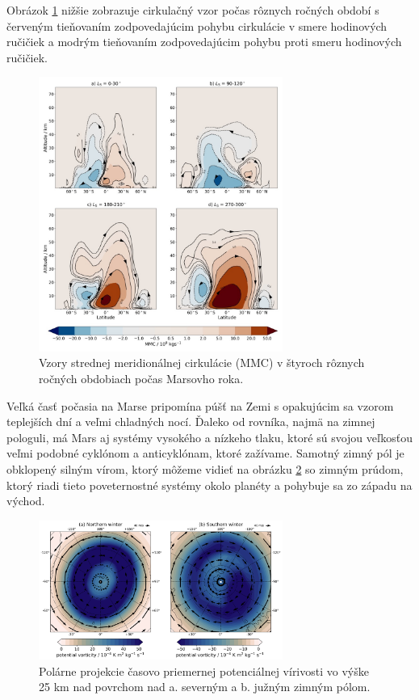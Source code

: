 Obrázok \ref{circLS} nižšie zobrazuje cirkulačný vzor počas rôznych ročných období s červeným tieňovaním zodpovedajúcim pohybu cirkulácie v smere hodinových ručičiek a modrým tieňovaním zodpovedajúcim pohybu proti smeru hodinových ručičiek. 

\begin{figure}[!htbp]
  \centering
  \includegraphics[width=8cm]{img/MARS_circulation_openMars_LS.jpg}
  \caption{Vzory strednej meridionálnej cirkulácie (MMC) v štyroch rôznych ročných obdobiach počas Marsovho roka.}
  \label{circLS}
\end{figure}

Veľká časť počasia na Marse pripomína púšť na Zemi s opakujúcim sa vzorom teplejších dní a veľmi chladných nocí. Ďaleko od rovníka, najmä na zimnej pologuli, má Mars aj systémy vysokého a nízkeho tlaku, ktoré sú svojou veľkosťou veľmi podobné cyklónom a anticyklónam, ktoré zažívame. Samotný zimný pól je obklopený silným vírom, ktorý môžeme vidieť na obrázku \ref{circPolar} so zimným prúdom, ktorý riadi tieto poveternostné systémy okolo planéty a pohybuje sa zo západu na východ.

\begin{figure}[!htbp]
  \centering
  \includegraphics[width=8cm]{img/MARS_circulation_openMars_polar.png}
  \caption{Polárne projekcie časovo priemernej potenciálnej vírivosti vo výške 25 km nad povrchom nad a. severným a b. južným zimným pólom.}
  \label{circPolar}
\end{figure}

